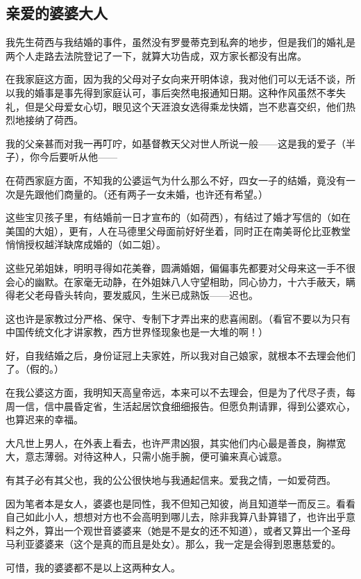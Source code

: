 \subsection{亲爱的婆婆大人}

\par 我先生荷西与我结婚的事件，虽然没有罗曼蒂克到私奔的地步，但是我们的婚礼是两个人走路去法院登记了一下，就算大功告成，双方家长都没有出席。
\par 在我家庭这方面，因为我的父母对子女向来开明体谅，我对他们可以无话不谈，所以我的婚事是事先得到家庭认可，事后突然电报通知日期。这种作风虽然不孝失礼，但是父母爱女心切，眼见这个天涯浪女选得乘龙快婿，岂不悲喜交织，他们热烈地接纳了荷西。
\par 我的父亲甚而对我一再叮咛，如基督教天父对世人所说一般——这是我的爱子（半子），你今后要听从他——
\par 在荷西家庭方面，不知我的公婆运气为什么那么不好，四女一子的结婚，竟没有一次是先跟他们商量的。（还有两子一女未婚，也许还有希望。）
\par 这些宝贝孩子里，有结婚前一日才宣布的（如荷西），有结过了婚才写信的（如在美国的大姐），更有，人在马德里父母面前好好坐着，同时正在南美哥伦比亚教堂悄悄授权越洋缺席成婚的（如二姐）。
\par 这些兄弟姐妹，明明寻得如花美眷，圆满婚姻，偏偏事先都要对父母来这一手不很会心的幽默。在家毫无动静，在外姐妹八人守望相助，同心协力，十六手蔽天，瞒得老父老母昏头转向，要发威风，生米已成熟饭——迟也。
\par 这也许是家教过分严格、保守、专制下才弄出来的悲喜闹剧。（看官不要以为只有中国传统文化才讲家教，西方世界怪现象也是一大堆的啊！）
\par 好，自我结婚之后，身份证冠上夫家姓，所以我对自己娘家，就根本不去理会他们了。（假的。）
\par 在我公婆这方面，我明知天高皇帝远，本来可以不去理会，但是为了代尽子责，每周一信，信中晨昏定省，生活起居饮食细细报告。但愿负荆请罪，得到公婆欢心，也算迟来的幸福。
\par 大凡世上男人，在外表上看去，也许严肃凶狠，其实他们内心最是善良，胸襟宽大，意志薄弱。对待这种人，只需小施手腕，便可骗来真心诚意。
\par 有其子必有其父也，我的公公很快地与我通起信来。爱我之情，一如爱荷西。
\par 因为笔者本是女人，婆婆也是同性，我不但知己知彼，尚且知道举一而反三。看看自己如此小人，想想对方也不会高明到哪儿去，除非我算八卦算错了，也许出乎意料之外，算出一个观世音婆婆来（她是不是女的还不知道），或者又算出一个圣母马利亚婆婆来（这个是真的而且是处女）。那么，我一定是会得到恩惠慈爱的。
\par 可惜，我的婆婆都不是以上这两种女人。
